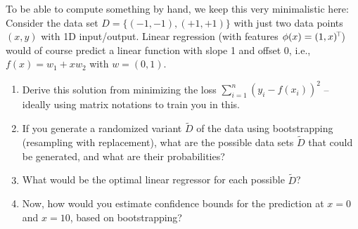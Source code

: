 

To be able to compute something by hand, we keep this very minimalistic here: Consider the data set $D=\{(-1,-1), (+1,+1)\}$ with just two data points $(x,y)$ with 1D input/output. Linear regression (with features $\phi(x) = (1,x)^{\!\top\!}$) would of course predict a linear function with slope 1 and offset 0, i.e., $f(x) = w_1 + x w_2$ with $w=(0,1)$.

\begin{enumerate}
\item Derive this solution from minimizing the loss $\sum_{i=1}^n (y_i - f(x_i))^2$ -- ideally using matrix notations to train you in this.
\item If you generate a randomized variant $\tilde D$ of the data using bootstrapping (resampling with replacement), what are the possible data sets $\tilde D$ that could be generated, and what are their probabilities?
\item What would be the optimal linear regressor for each possible $\tilde D$?
\item Now, how would you estimate confidence bounds for the prediction at $x=0$ and $x=10$, based on bootstrapping?
\end{enumerate}

